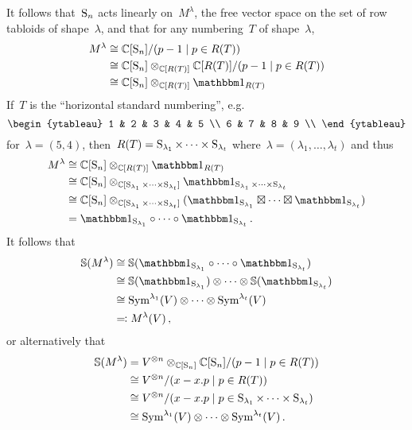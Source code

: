 \documentclass[a4paper,10pt]{scrartcl}
\begin{document}
It follows that~$\operatorname{S}_n$ acts linearly on~$M^\lambda$, the free vector space on the set of row tabloids of shape~$\lambda$, and that for any numbering~$T$ of shape~$\lambda$,
\begin{align*}
  M^\lambda
  &\cong
  \Complex[\symm_n]/(p - 1 \suchthat p \in R(T))
  \\
  &\cong
  \Complex[\symm_n] \tensor_{\Complex[R(T)]} \Complex[R(T)]/(p - 1 \suchthat p \in R(T))
  \\
  &\cong
  \Complex[\symm_n] \tensor_{\Complex[R(T)]} \trivrep_{R(T)}
\end{align*}
If~$T$ is the \enquote{horizontal standard numbering}, e.g.
\[
  \begin{ytableau}
     1 &  2 & 3 & 4 & 5 \\
     6 &  7 & 8 & 9 \\
  \end{ytableau}
\]
for~$\lambda = (5,4)$, then~$R(T) = \operatorname{S}_{\lambda_1} \times \dotsb \times \operatorname{S}_{\lambda_t}$ where~$\lambda = (\lambda_1, \dotsc, \lambda_t)$ and thus
\begin{align*}
  M^\lambda
  &\cong
  \Complex[\symm_n] \tensor_{\Complex[R(T)]} \trivrep_{R(T)}
  \\
  &\cong
  \Complex[\symm_n]
  \tensor_{\Complex[\symm_{\lambda_1} \times \dotsb \times \symm_{\lambda_t}]}
  \trivrep_{\symm_{\lambda_1} \times \dotsb \times \symm_{\lambda_t}}
  \\
  &\cong
  \Complex[\symm_n]
  \tensor_{\Complex[\symm_{\lambda_1} \times \dotsb \times \symm_{\lambda_t}]}
  (\trivrep_{\symm_{\lambda_1}} \outertensor \dotsb \outertensor \trivrep_{\symm_{\lambda_t}})
  \\
  &=
  \trivrep_{\symm_{\lambda_1}} \circ \dotsb \circ \trivrep_{\symm_{\lambda_t}} \,.
\end{align*}
It follows that
\begin{align*}
  \Schur(M^\lambda)
  &\cong
  \Schur(\trivrep_{\symm_{\lambda_1}} \circ \dotsb \circ \trivrep_{\symm_{\lambda_t}})
  \\
  &\cong
  \Schur(\trivrep_{\symm_{\lambda_1}}) \tensor \dotsb \tensor \Schur(\trivrep_{\symm_{\lambda_t}})
  \\
  &\cong
  \Symm^{\lambda_1}(V) \tensor \dotsb \tensor \Symm^{\lambda_t}(V)
  \\
  &\defines
  M^\lambda(V) \,,
\end{align*}
or alternatively that
\begin{align*}
  \Schur(M^\lambda)
  &=
  V^{\tensor n} \tensor_{\Complex[\symm_n]} \Complex[\symm_n]/(p - 1 \suchthat p \in R(T))
  \\
  &\cong
  V^{\tensor n}/(x - x.p \suchthat p \in R(T))
  \\
  &\cong
  V^{\tensor n}/(x - x.p \suchthat p \in \symm_{\lambda_1} \times \dotsb \times \symm_{\lambda_t})
  \\
  &\cong
  \Symm^{\lambda_1}(V) \otimes \dotsb \otimes \Symm^{\lambda_t}(V) \,.
\end{align*}
\end{document}
